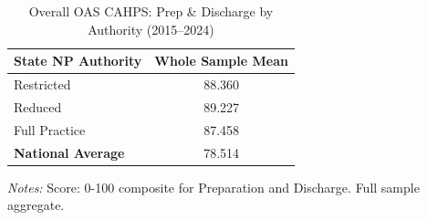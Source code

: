 \begin{table}[htbp]
    \centering
    \caption{Overall OAS CAHPS: Prep \& Discharge by Authority (2015--2024)}
    \label{tab:oas_grp3_full}
    \vspace{0.2cm}
    \begin{tabular}{lc}
        \toprule
        \textbf{State NP Authority} & \textbf{Whole Sample Mean} \\
        \midrule
        Restricted & 88.360 \\
        Reduced & 89.227 \\
        Full Practice & 87.458 \\
        \midrule
        \textbf{National Average} & 78.514 \\
        \bottomrule
    \end{tabular}
    \vspace{0.1cm}
    \begin{minipage}{0.6\textwidth}
        \footnotesize \textit{Notes:} Score: 0-100 composite for Preparation and Discharge. Full sample aggregate.
    \end{minipage}
\end{table}